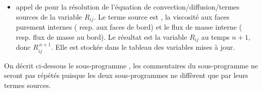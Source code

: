 \begin{itemize}
\begin{itemize}
\item [$\star$] Appel de  pour calculer la viscosit\'e orthotrope
\footnote{Comme dans le sous-programme , on multiplie la viscosit\'e par
$\displaystyle \frac{S_{\,lm}}{\overline{L'M'}}$, o\`u $S_{\,lm}$ et
$\overline{L'M'}$ repr\'esentent respectivement la surface de la face $lm$ et la
mesure alg\'ebrique du segment reliant les projections des centres des cellules
voisines sur la normale \`a la face. On garde dans ce sous-programme  la possibilit\'e d'interpoler la viscosit\'e aux cellules lin\'eairement ou d'utiliser une moyenne harmonique. La viscosit\'e au bord est celle de la cellule de bord correspondante.}
$ \gamma^n_{\,lm} = (\tens{D}^{\,n}\,\vect{n}_{\,lm}).\vect{n}_{\,lm}$ aux faces $lm$

Le r\'esultat est stock\'e dans les tableaux  et .
\end{itemize}

\item appel de  pour la r\'esolution de l'\'equation de
convection/diffusion/termes sources de la variable $R_{ij}$. Le terme source est
, la viscosit\'e  aux faces purement internes (
resp.  aux faces de bord) et  le flux de masse interne
 ( resp.  flux de masse au bord). Le r\'esultat est la variable $R_{ij}$ au temps
$n+1$, donc $R^{\,n+1}_{ij}$. Elle est stock\'ee dans le tableau  des
variables mises \`a jour.

\end{itemize}


On d\'ecrit ci-dessous le sous-programme , les commentaires du sous-programme  ne seront pas r\'ep\'et\'es puisque les deux sous-programmes ne diff\`erent que par leurs termes sources.

